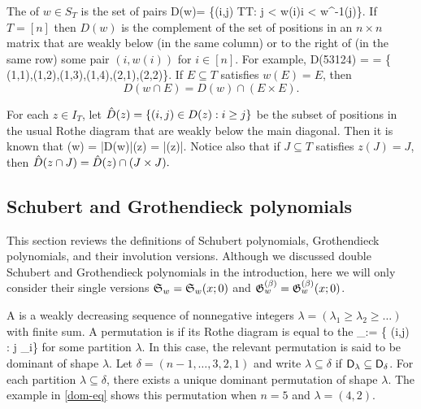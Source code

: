 \documentclass[10pt]{article}
\begin{document}
 
The  of $w \in S_T$ is the set of pairs 
\be
D(w)= \left\{(i,j) \in T\times T:
j < w(i)i < w^{-1}(j)\right\}.
\ee
If $T = [n]$ then $D(w)$ is the complement of the set of positions in an $n\times n$ matrix 
that are weakly below (in the same column) or to the right of (in the same row) some pair $(i,w(i))$ for $i \in [n]$. For example,
\be\label{dom-eq}
D(53124) = = \{ (1,1),(1,2),(1,3),(1,4),(2,1),(2,2)\}.
\ee
If $E\subseteq T$ satisfies $w(E)=E$, then 
\begin{equation}
\label{EQ: Rothe pattern}
D(w\cap E)=D(w)\cap(E\times E).
\end{equation}


For each $z \in I_T$, let 
$\hat D(z) =\{ (i,j) \in D(z) : i \geq j\}$ be the subset of positions in the usual Rothe diagram that 
are weakly below the main diagonal.
Then it is known \cite[\S3.2]{HMP1}
that
\be
\ell(w) = |D(w)|\qquand \ellinv(z) = |\iD(z)|.
\ee
Notice also that if $J\subseteq T$ satisfies $z(J)=J$, then
$
\hat D(z\cap J)
=
\hat D(z)\cap(J\times J).
$

\subsection{Schubert and Grothendieck polynomials}\label{sch-sect}

This section reviews the definitions of Schubert polynomials,
Grothendieck polynomials, and their involution versions.
Although we discussed double Schubert and Grothendieck polynomials in the introduction, 
here we will only consider their single versions
$\mathfrak S_w = \mathfrak S_w(x;0)$ and $\mathfrak{G}^{(\beta)}_w =\mathfrak{G}^{(\beta)}_w(x;0)$.

A  is a weakly decreasing sequence of 
nonnegative integers $\lambda=(\lambda_1\geq \lambda_2\geq \dots)$
with finite sum. A permutation is  if its Rothe diagram is equal to the 
\be
\D_\lambda := \{ (i,j) \in \PP\times \PP : j \leq \lambda_i\}
\ee
for some partition $\lambda$. In this case, the relevant permutation is said to be dominant of shape $\lambda$. 
%
Let $\delta = (n-1,\dots,3,2,1)$ and write $\lambda \subseteq \delta$ if $\mathsf{D}_\lambda \subseteq \mathsf{D}_\delta$.
For each partition $\lambda \subseteq \delta$,
there exists a unique dominant permutation of shape $\lambda$.
The example in \eqref{dom-eq} shows this permutation when $n=5$ and $\lambda =(4,2)$.
\end{document}
